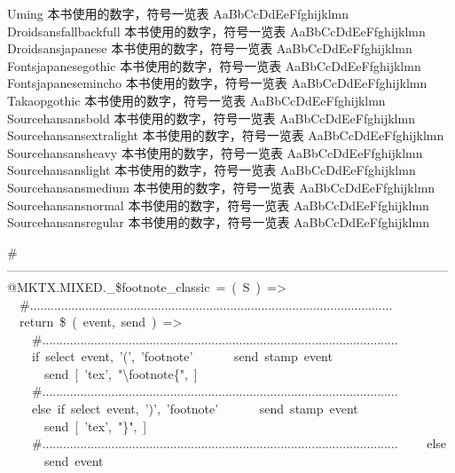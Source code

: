 Uming {\cjk\mktsFontfileUming{}本书使用的数字，符号一览表 AaBbCcDdEeFfghijklmn}\\
Droidsansfallbackfull {\cjk\mktsFontfileDroidsansfallbackfull{}本书使用的数字，符号一览表 AaBbCcDdEeFfghijklmn}\\
Droidsansjapanese {\cjk\mktsFontfileDroidsansjapanese{}本书使用的数字，符号一览表 AaBbCcDdEeFfghijklmn}\\
Fontsjapanesegothic {\cjk\mktsFontfileFontsjapanesegothic{}本书使用的数字，符号一览表 AaBbCcDdEeFfghijklmn}\\
Fontsjapanesemincho {\cjk\mktsFontfileFontsjapanesemincho{}本书使用的数字，符号一览表 AaBbCcDdEeFfghijklmn}\\
Takaopgothic {\cjk\mktsFontfileTakaopgothic{}本书使用的数字，符号一览表 AaBbCcDdEeFfghijklmn}\\
Sourcehansansbold {\cjk\mktsFontfileSourcehansansbold{}本书使用的数字，符号一览表 AaBbCcDdEeFfghijklmn}\\
Sourcehansansextralight {\cjk\mktsFontfileSourcehansansextralight{}本书使用的数字，符号一览表 AaBbCcDdEeFfghijklmn}\\
Sourcehansansheavy {\cjk\mktsFontfileSourcehansansheavy{}本书使用的数字，符号一览表 AaBbCcDdEeFfghijklmn}\\
Sourcehansanslight {\cjk\mktsFontfileSourcehansanslight{}本书使用的数字，符号一览表 AaBbCcDdEeFfghijklmn}\\
Sourcehansansmedium {\cjk\mktsFontfileSourcehansansmedium{}本书使用的数字，符号一览表 AaBbCcDdEeFfghijklmn}\\
Sourcehansansnormal {\cjk\mktsFontfileSourcehansansnormal{}本书使用的数字，符号一览表 AaBbCcDdEeFfghijklmn}\\
Sourcehansansregular {\cjk\mktsFontfileSourcehansansregular{}本书使用的数字，符号一览表 AaBbCcDdEeFfghijklmn}\\



\begingroup\mktsObeyAllLines{}

\begingroup\mktsStyleCode{}\#-----------------------------------------------------------------------------------------------------------
@MKTX.MIXED.\_\$footnote\_classic = ( S ) =>
  \#.........................................................................................................
  return \$ ( event, send ) =>
    \#.......................................................................................................
    if select event, '(', 'footnote'
      send stamp event
      send [ 'tex', "\textbackslash{}footnote\{", ]
    \#.......................................................................................................
    else if select event, ')', 'footnote'
      send stamp event
      send [ 'tex', "\}", ]
    \#.......................................................................................................
    else
      send event
\endgroup{}{}

\endgroup{}